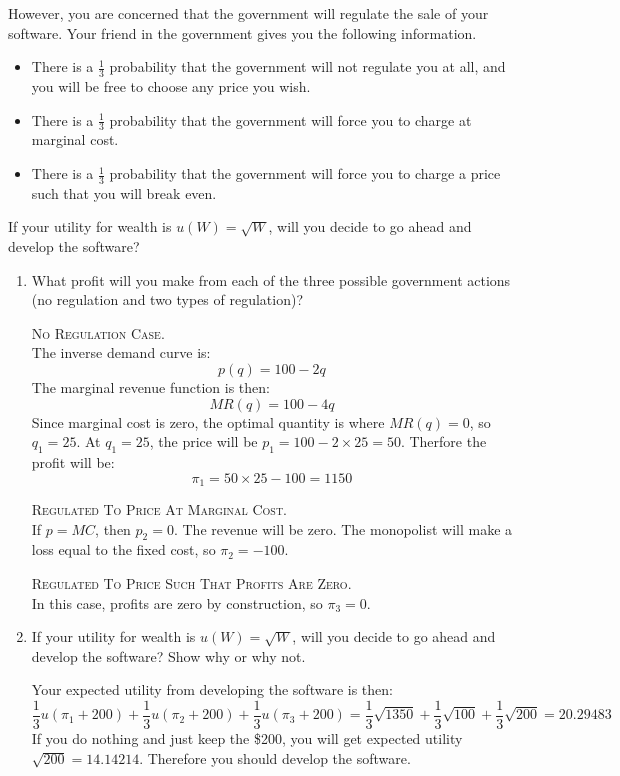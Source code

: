 \documentclass[12pt]{article}
\newcounter{question}[section]
\newenvironment{subquestions}{
  \begin{enumerate}[label=(\roman*)]}{\end{enumerate}}
\begin{document}
However, you are concerned that the government will regulate the sale of your
software.  Your friend in the government gives you the following information.
\begin{itemize}
  \item There is a $\frac{1}{3}$ probability that the government will not
    regulate you at all, and you will be free to choose any price you wish.
  \item There is a $\frac{1}{3}$ probability that the government will force you
    to charge at marginal cost.
  \item There is a $\frac{1}{3}$ probability that the government will force you
    to charge a price such that you will break even.
\end{itemize}
If your utility for wealth is $u\left( W \right)=\sqrt{W}$, will you decide to
go ahead and develop the software?
\bigskip

\begin{subquestions}
\item What profit will you make from each of the three
  possible government actions (no regulation and two types of regulation)?

\textcolor{solution-color}{
  \textsc{No Regulation Case}. \\ The inverse demand curve is:
  \[
    p\left( q \right)=100 - 2q
  \]
  The marginal revenue function is then:
  \[
    MR\left( q \right)=100 - 4q
  \]
  Since marginal cost is zero, the optimal quantity is where $MR\left( q
  \right)=0$, so $q_1=25$. At $q_1=25$, the price will be $p_1=100-2\times 25 =
  50$. Therfore the profit will be:
  \[
    \pi_1 = 50\times 25 - 100=1150
  \]
}

\noindent \textcolor{solution-color}{
  \textsc{Regulated To Price At Marginal Cost}. \\
  If $p=MC$, then $p_2=0$. The revenue will be zero. The monopolist will make
  a loss equal to the fixed cost, so $\pi_2=-100$.
}

\bigskip
\noindent \textcolor{solution-color}{
  \textsc{Regulated To Price Such That Profits Are Zero}. \\
  In this case, profits are zero by construction, so $\pi_3=0$.
}
  \item If your utility for wealth is $u\left( W
    \right)=\sqrt{W}$, will you decide to go ahead and develop the software?
    Show why or why not.

\textcolor{solution-color}{
  Your expected utility from developing the software is then:
  \[
    \frac{1}{3}u\left( \pi_1+200 \right)+\frac{1}{3}u\left( \pi_2+200
    \right)+\frac{1}{3}u\left( \pi_3+200 \right)=
    \frac{1}{3}\sqrt{1350} + \frac{1}{3}\sqrt{100} +
    \frac{1}{3}\sqrt{200}=20.29483
  \]
  If you do nothing and just keep the \$200, you will get expected utility
  $\sqrt{200}=14.14214$. Therefore you should develop the software.
}
\end{subquestions}
\end{document}
